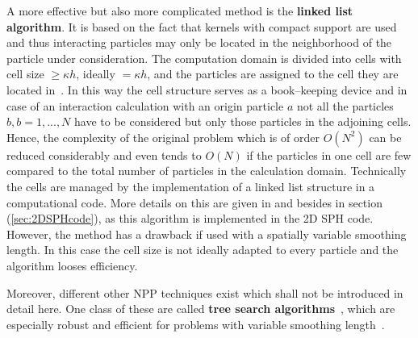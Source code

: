 \documentclass{report}
\begin{document}
A more effective but also more complicated method is the {\bf linked list
algorithm}. It is based on the fact that kernels with compact support are
used and thus interacting particles may only be located in the neighborhood of
the particle under consideration. The computation domain is divided into cells with
cell size $\ge \kappa h$, ideally $=\kappa h$, and the
particles are assigned to the cell they are located in~\cite{Monaghan1983}. In this way the cell
structure serves as a book--keeping device and in case of an interaction
calculation with an origin particle $a$ not all the particles $b,b={1,...,N}$ have to be considered but only those particles in the adjoining cells. Hence, the
complexity of the original problem which is of order $O(N^2)$ can be reduced
considerably and even tends to $O(N)$ if the particles in one cell are few compared to the total number of particles in the calculation domain. 
Technically the cells are managed by the implementation of a linked list
structure in a computational code. More details on this are given in \cite{Monaghan1985, Hockney1988} and besides in section
(\ref{sec:2DSPHcode}), as this algorithm is implemented in the 2D
SPH code.
However, the method has a drawback if used with a spatially variable smoothing
length. In this case the cell size is not ideally adapted to every particle
and the algorithm looses efficiency.

Moreover, different other NPP techniques exist which shall not be introduced in
detail here. One class of these are called {\bf tree search algorithms}~\cite{Hernquist1989}, which are
especially robust and efficient for problems with variable smoothing
length~\cite{Liu2003}.
\end{document}
